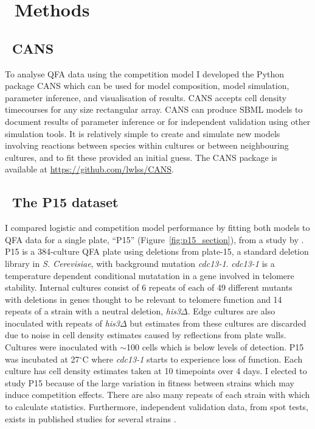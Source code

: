 \graphicspath{{images/}}

\section{\thesection~Methods}
\label{sec:methods}

\subsection{\thesubsection~CANS}

To analyse QFA data using the competition model I developed the Python
package CANS which can be used for model composition, model
simulation, parameter inference, and visualisation of results. CANS
accepts cell density timecourses for any size rectangular array. CANS
can produce SBML models to document results of parameter inference or
for independent validation using other simulation tools. It is
relatively simple to create and simulate new models involving
reactions between species within cultures or between neighbouring
cultures, and to fit these provided an initial guess. The CANS package
is available at
\href{https://github.com/lwlss/CANS}{https://github.com/lwlss/CANS}.



\subsection{\thesubsection~The P15 dataset}
\label{sec:P15_description}

I compared logistic and competition model performance by fitting both
models to QFA data for a single plate, ``P15''
(Figure~\ref{fig:p15_section}), from a study by
\citet{Addinall2011}. P15 is a 384-culture QFA plate using deletions
from plate-15, a standard deletion library in \textit{S. Cerevisiae},
with background mutation \textit{cdc13-1}. \textit{cdc13-1} is a
temperature dependent conditional mutatation in a gene involved in
telomere stability. Internal cultures consist of 6 repeats of each of
49 different mutants with deletions in genes thought to be relevant to
telomere function and 14 repeats of a strain with a neutral deletion,
\textit{his3}\(\Delta\). Edge cultures are also inoculated with
repeats of \textit{his3}\(\Delta\) but estimates from these cultures
are discarded due to noise in cell density estimates caused by
reflections from plate walls. Cultures were inoculated with
\(\sim\)100 cells which is below levels of detection. P15 was
incubated at 27\(^{\circ}\)C where \textit{cdc13-1} starts to
experience loss of function. Each culture has cell density estimates
taken at 10 timepoints over 4 days. I elected to study P15 because of
the large variation in fitness between strains which may induce
competition effects. There are also many repeats of each strain with
which to calculate statistics. Furthermore, independent validation
data, from spot tests, exists in published studies for several strains
\citep{maringele2002exo1,zubko2004exo1,Holstein20141259,foster2006mrx}.

